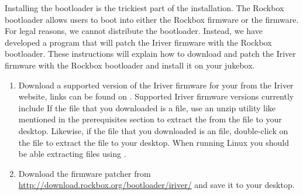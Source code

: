 
  Installing the bootloader is the trickiest part of the installation.
  The Rockbox bootloader allows users to boot into either the Rockbox 
  firmware or the \playerman{} firmware. For legal reasons, we cannot distribute 
  the bootloader. Instead, we have developed a program that will patch the 
  Iriver firmware with the Rockbox bootloader. These instructions will explain 
  how to download and patch the Iriver firmware with the Rockbox bootloader 
  and install it on your jukebox.


\begin{enumerate}
  \item Download a supported version of the Iriver firmware for your 
  \playername{} from the Iriver website, links can be found on 
  .
  Supported Iriver firmware versions currently include 
  If the file that you downloaded is a  file, use an unzip 
  utility like mentioned in the prerequisites section to extract
  the  from the  file
  to your desktop. Likewise, if the file that you downloaded is an 
   file, double-click on the  file to extract 
  the  file to your desktop.
  When running Linux you should be able extracting 
  files using .
  \item Download the firmware patcher  from 
  \url{http://download.rockbox.org/bootloader/iriver/} and save it to your desktop.
\end{enumerate}
